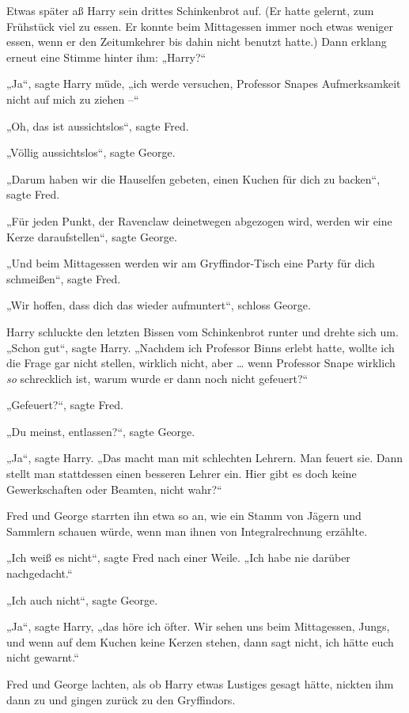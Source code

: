 {Etwas später aß Harry sein drittes Schinkenbrot auf. (Er hatte gelernt, zum Frühstück viel zu essen. Er konnte beim Mittagessen immer noch etwas weniger essen, wenn er den Zeitumkehrer bis dahin nicht benutzt hatte.) Dann erklang erneut eine Stimme hinter ihm: „Harry?“

„Ja“, sagte Harry müde, „ich werde versuchen, Professor Snapes Aufmerksamkeit nicht auf mich zu ziehen --“

„Oh, das ist aussichtslos“, sagte Fred.

„Völlig aussichtslos“, sagte George.

„Darum haben wir die Hauselfen gebeten, einen Kuchen für dich zu backen“, sagte Fred.

„Für jeden Punkt, der Ravenclaw deinetwegen abgezogen wird, werden wir eine Kerze daraufstellen“, sagte George.

„Und beim Mittagessen werden wir am Gryffindor-Tisch eine Party für dich schmeißen“, sagte Fred.

„Wir hoffen, dass dich das wieder aufmuntert“, schloss George.

Harry schluckte den letzten Bissen vom Schinkenbrot runter und drehte sich um. „Schon gut“, sagte Harry. „Nachdem ich Professor Binns erlebt hatte, wollte ich die Frage gar nicht stellen, wirklich nicht, aber … wenn Professor Snape wirklich \emph{so} schrecklich ist, warum wurde er dann noch nicht gefeuert?“

„Gefeuert?“, sagte Fred.

„Du meinst, entlassen?“, sagte George.

„Ja“, sagte Harry. „Das macht man mit schlechten Lehrern. Man feuert sie. Dann stellt man stattdessen einen besseren Lehrer ein. Hier gibt es doch keine Gewerkschaften oder Beamten, nicht wahr?“

Fred und George starrten ihn etwa so an, wie ein Stamm von Jägern und Sammlern schauen würde, wenn man ihnen von Integralrechnung erzählte.

„Ich weiß es nicht“, sagte Fred nach einer Weile. „Ich habe nie darüber nachgedacht.“

„Ich auch nicht“, sagte George.

„Ja“, sagte Harry, „das höre ich öfter. Wir sehen uns beim Mittagessen, Jungs, und wenn auf dem Kuchen keine Kerzen stehen, dann sagt nicht, ich hätte euch nicht gewarnt.“

Fred und George lachten, als ob Harry etwas Lustiges gesagt hätte, nickten ihm dann zu und gingen zurück zu den Gryffindors.

}
